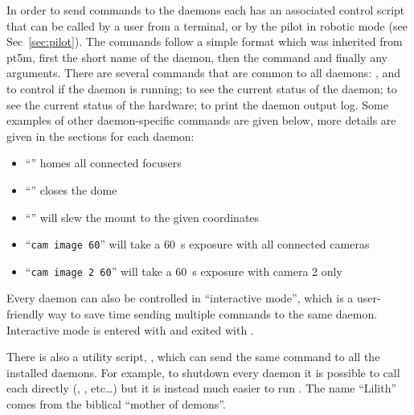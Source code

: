 \begin{colsection}
\begin{colsection}
In order to send commands to the daemons each has an associated control script that can be called by a user from a terminal, or by the pilot in robotic mode (see Sec~\ref{sec:pilot}). The commands follow a simple format which was inherited from \gls{pt5m}, first the short name of the daemon, then the command and finally any arguments. There are several commands that are common to all daemons: ,  and  to control if the daemon is running;  to see the current status of the daemon;  to see the current status of the hardware;  to print the daemon output log. Some examples of other daemon-specific commands are given below,
more details are given in the sections for each daemon:
\begin{itemize}
    \item ``'' homes all connected focusers
    \item ``'' closes the dome
    \item ``'' will slew the mount to the given coordinates
    \item ``\texttt{cam~image~60}'' will take a \SI{60}{\second} exposure with all connected cameras
    \item ``\texttt{cam~image~2~60}'' will take a \SI{60}{\second} exposure with camera 2 only
\end{itemize}

Every daemon can also be controlled in ``interactive mode'', which is a user-friendly way to save time sending multiple commands to the same daemon. Interactive mode is entered with  and exited with .

There is also a utility script, , which can send the same command to all the installed daemons. For example, to shutdown every daemon it is possible to call each directly (, ,  etc\ldots) but it is instead much easier to run . The name ``Lilith'' comes from the biblical ``mother of demons''.


\end{colsection}
\end{colsection}
